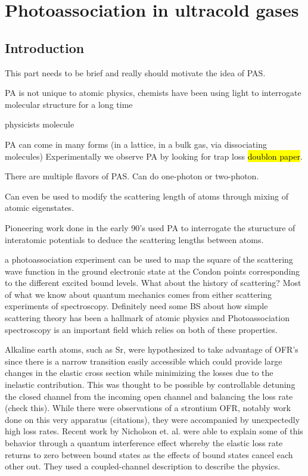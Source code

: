 \chapter{Photoassociation in ultracold gases}
\label{ch:chap3}

\section{Introduction}
\label{sec:pas_intro}

This part needs to be brief and really should motivate the idea of PAS.

PA is not unique to atomic physics, chemists have been using light to interrogate molecular structure for a long time

physicists molecule

PA can come in many forms (in a lattice, in a bulk gas, via dissociating molecules) Experimentally we observe PA by looking for trap loss \hl{doublon paper}.

There are multiple flavors of PAS. Can do one-photon or two-photon.

Can even be used to modify the scattering length of atoms through mixing of atomic eigenstates. 

Pioneering work done in the early 90's used PA to interrogate the sturucture of interatomic potentials to deduce the scattering lengths between atoms.

a photoassociation experiment can be used to map the square of the scattering wave function in the ground electronic state at the Condon points corresponding to the different excited bound levels. \cite{Borkowski2009}
What about the history of scattering? 
Most of what we know about quantum mechanics comes from either scattering experiments of spectroscopy. 
Definitely need some BS about how simple scattering theory has been a hallmark of atomic physics and 
Photoassociation spectroscopy is an important field which relies on both of these properties.

Alkaline earth atoms, such as Sr, were hypothesized to take advantage of OFR's since there is a narrow transition easily accessible which could provide large changes in the elastic cross section while minimizing the losses due to the inelastic contribution. This was thought to be possible by controllable detuning the closed channel from the incoming open channel and balancing the loss rate (check this). While there were observations of a strontium OFR, notably work done on this very apparatus (citations), they were accompanied by unexpectedly high loss rates. Recent work by Nicholson et. al. were able to explain some of this behavior through a quantum interference effect whereby the elastic loss rate returns to zero between bound states as the effects of bound states cancel each other out. They used a coupled-channel description to describe the physics.
 
